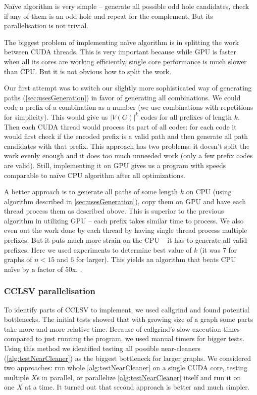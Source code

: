 Na\"ive algorithm is very simple -- generate all possible odd hole candidates, check if any of them is an odd hole and repeat for the complement. But its parallelisation is not trivial.

The biggest problem of implementing na\"ive algorithm is in splitting the work between CUDA threads. This is very important because while GPU is faster when all its cores are working efficiently, single core performance is much slower than CPU. But it is not obvious how to split the work.

Our first attempt was to switch our slightly more sophisticated way of generating paths (\cref{sec:usesGeneration}) in favor of generating all combinations. We could code a prefix of a combination as a number (we use combinations with repetitions for simplicity). This would give us $|V(G)|^k$ codes for all prefixes of length $k$. Then each CUDA thread would process its part of all codes: for each code it would first check if the encoded prefix is a valid path and then generate all path candidates with that prefix. This approach has two problems: it doesn't split the work evenly enough and it does too much unneeded work (only a few prefix codes are valid). Still, implementing it on GPU gives us a program with speeds comparable to na\"ive CPU algorithm after all optimizations.

A better approach is to generate all paths of some length $k$ on CPU (using algorithm described in \cref{sec:usesGeneration}), copy them on GPU and have each thread process them as described above. This is superior to the previous algorithm in utilizing GPU -- each prefix takes similar time to process. We also even out the work done by each thread by having single thread process multiple prefixes. But it puts much more strain on the CPU -- it has to generate all valid prefixes. Here we used experiments to determine best value of $k$ (it was 7 for graphs of $n < 15$  and 6 for larger). This yields an algorithm that beats CPU na\"ive by a factor of 50x. .

\subsubsection{CCLSV parallelisation}

To identify parts of CCLSV to implement, we used callgrind and found potential bottlenecks. The initial tests showed that with growing size of a graph some parts take more and more relative time. Because of callgrind's slow execution times compared to just running the program, we used manual timers for bigger tests. Using this method we identified testing all possible near-cleaners (\cref{alg:testNearCleaner}) as the biggest bottleneck for larger graphs. We considered two approaches: run whole \cref{alg:testNearCleaner} on a single CUDA core, testing multiple $X$s in parallel, or parallelize \cref{alg:testNearCleaner} itself and run it on one $X$ at a time. It turned out that second approach is better and much simpler.

